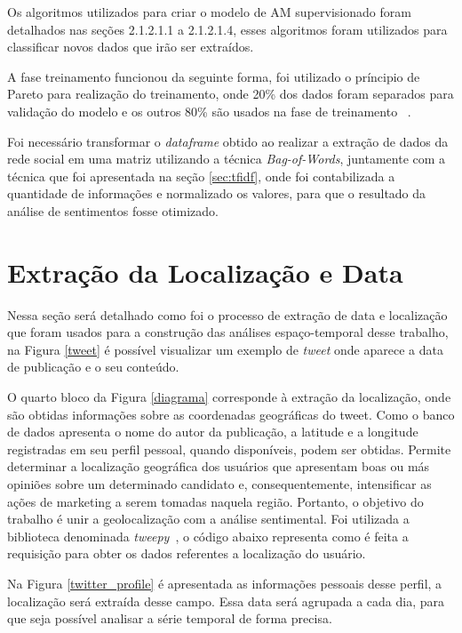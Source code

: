 Os algoritmos utilizados para criar o modelo de \acrshort{AM} supervisionado foram detalhados nas seções 2.1.2.1.1 a 2.1.2.1.4, esses algoritmos foram 
utilizados para classificar novos dados que irão ser extraídos. 

A fase treinamento funcionou da seguinte forma, foi utilizado o príncipio de Pareto para realização do treinamento, onde 20\% dos dados foram 
separados para validação do modelo e os outros 80\% são usados na fase de treinamento ~\cite{jin2008pareto}. 


Foi necessário transformar o \textit{dataframe} obtido ao realizar a extração de dados da rede social em uma matriz utilizando a técnica \textit{Bag-of-Words}, 
juntamente com a técnica que foi apresentada na seção \ref{sec:tfidf}, onde foi contabilizada a quantidade de informações e normalizado os valores, para 
que o resultado da análise de sentimentos fosse otimizado.


\section{Extração da Localização e Data}
\label{extract_timestamp}

Nessa seção será detalhado como foi o processo de extração de data e localização que foram usados para a construção das análises espaço-temporal
desse trabalho, na Figura \ref{tweet} é possível visualizar um exemplo de \textit{tweet} onde aparece a data de publicação e o seu conteúdo. 





O quarto bloco da Figura \ref{diagrama} corresponde à extração da
localização, onde são obtidas informações sobre as coordenadas
geográficas do tweet. Como o banco de dados apresenta
o nome do autor da publicação, a latitude e a longitude
registradas em seu perfil pessoal, quando disponíveis, podem
ser obtidas. Permite determinar a localização geográfica dos
usuários que apresentam boas ou más opiniões sobre um
determinado candidato e, consequentemente, intensificar as
ações de marketing a serem tomadas naquela região. Portanto,
o objetivo do trabalho é unir a geolocalização com a análise
sentimental. Foi utilizada a biblioteca denominada \textit{tweepy}~\cite{roesslein2009tweepy}, o código abaixo representa como é feita a requisição 
para obter os dados referentes a localização do usuário.



%

Na Figura \ref{twitter_profile} é apresentada as informações pessoais desse perfil, a localização será extraída desse campo. Essa data será agrupada 
a cada dia, para que seja possível analisar a série temporal de forma precisa.

%


